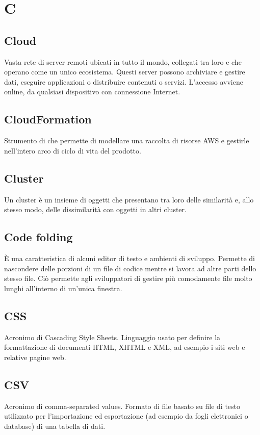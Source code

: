 \section*{C}
\markright{}

\subsection*{Cloud}
Vasta rete di server remoti ubicati in tutto il mondo, collegati tra loro e che operano come un unico ecosistema. Questi server possono archiviare e gestire dati, eseguire applicazioni o distribuire contenuti o servizi. L'accesso avviene online, da qualsiasi dispositivo con connessione Internet.

\subsection*{CloudFormation}
Strumento di  che permette di modellare una raccolta di risorse AWS e gestirle nell'intero arco di ciclo di vita del prodotto.

\subsection*{Cluster}
Un cluster è un insieme di oggetti che presentano tra loro delle similarità e, allo stesso modo, delle dissimilarità con oggetti in altri cluster.

\subsection*{Code folding}
È una caratteristica di alcuni editor di testo e ambienti di sviluppo. Permette di nascondere delle porzioni di un file di codice mentre si lavora ad altre parti dello stesso file. Ciò permette agli sviluppatori di gestire più comodamente file molto lunghi all'interno di un'unica finestra.

\subsection*{CSS}
Acronimo di Cascading Style Sheets. Linguaggio usato per definire la formattazione di documenti HTML, XHTML e XML, ad esempio i siti web e relative pagine web.

\subsection*{CSV}
Acronimo di comma-separated values. Formato di file basato su file di testo utilizzato per l'importazione ed esportazione (ad esempio da fogli elettronici o database) di una tabella di dati. 
